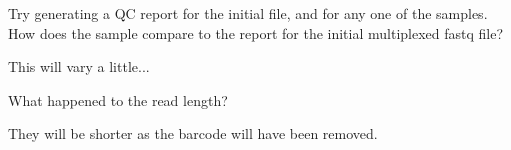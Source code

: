 \begin{questions}
Try generating a QC report for the initial file, and for any one of the samples. 
How does the sample compare to the report for the initial multiplexed fastq file? \\
\begin{answer}
This will vary a little...\\
\end{answer}
What happened to the read length? \\
\begin{answer}
They will be shorter as the barcode will have been removed.
\end{answer}
\end{questions}